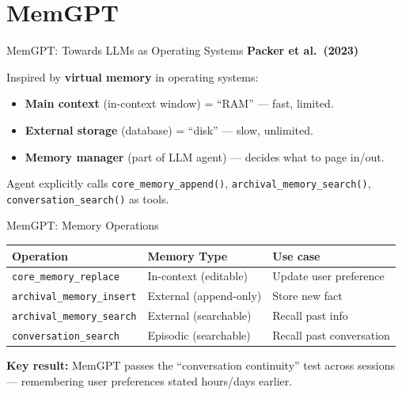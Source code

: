 \documentclass[aspectratio=169,10pt]{beamer}
\begin{document}
\section{MemGPT}

\begin{frame}{MemGPT: Towards LLMs as Operating Systems}
  \textbf{Packer et al.\ (2023)}~\cite{packer2023memgpt}
  \vspace{0.4em}
  \begin{tcolorbox}[hitbox, title=MemGPT Architecture]
    Inspired by \textbf{virtual memory} in operating systems:
    \begin{itemize}
      \item \textbf{Main context} (in-context window) = ``RAM'' — fast, limited.
      \item \textbf{External storage} (database) = ``disk'' — slow, unlimited.
      \item \textbf{Memory manager} (part of LLM agent) — decides what to page in/out.
    \end{itemize}
    Agent explicitly calls \texttt{core\_memory\_append()}, \texttt{archival\_memory\_search()}, \texttt{conversation\_search()} as tools.
  \end{tcolorbox}
\end{frame}

\begin{frame}{MemGPT: Memory Operations}
  \begin{center}
  \begin{tabular}{lll}
    \toprule
    \textbf{Operation} & \textbf{Memory Type} & \textbf{Use case} \\
    \midrule
    \texttt{core\_memory\_replace} & In-context (editable) & Update user preference \\
    \texttt{archival\_memory\_insert} & External (append-only) & Store new fact \\
    \texttt{archival\_memory\_search} & External (searchable) & Recall past info \\
    \texttt{conversation\_search} & Episodic (searchable) & Recall past conversation \\
    \bottomrule
  \end{tabular}
  \end{center}
  \vspace{0.4em}
  \textbf{Key result:} MemGPT passes the ``conversation continuity'' test across sessions —
  remembering user preferences stated hours/days earlier.
\end{frame}
\end{document}
